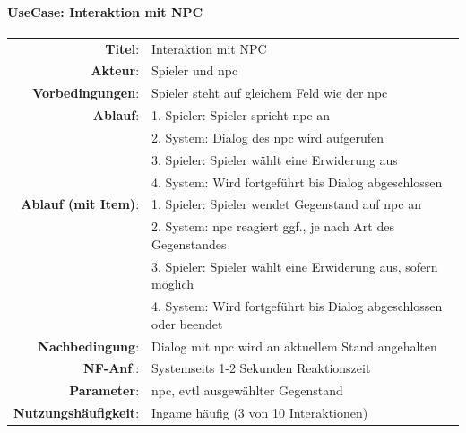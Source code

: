 \paragraph{UseCase: Interaktion mit NPC}
\begin{center}
	\begin{tabular}{|r l|}
	  \hline
	  \textbf{Titel}: & Interaktion mit NPC \\
	  \textbf{Akteur}: & \gls{Spieler} und \gls{npc} \\
	  \textbf{Vorbedingungen}: & \gls{Spieler} steht auf gleichem \gls{Feld} wie der \gls{npc} \\
	  \hline
	  \textbf{Ablauf}:
		& 1. Spieler: \gls{Spieler} spricht \gls{npc} an \\
		& 2. System:  \gls{Dialog} des \gls{npc} wird aufgerufen \\
		& 3. Spieler: \gls{Spieler} wählt eine \gls{Erwiderung} aus \\
		& 4. System:  Wird fortgeführt bis \gls{Dialog} abgeschlossen \\
	  \textbf{Ablauf (mit Item)}:
		& 1. Spieler: \gls{Spieler} wendet Gegenstand auf \gls{npc} an \\
		& 2. System:  \gls{npc} reagiert ggf., je nach Art des Gegenstandes \\
		& 3. Spieler: \gls{Spieler} wählt eine \gls{Erwiderung} aus, sofern möglich \\
		& 4. System:  Wird fortgeführt bis \gls{Dialog} abgeschlossen oder beendet \\
	  \hline
	  \textbf{Nachbedingung}: & \gls{Dialog} mit \gls{npc} wird an aktuellem Stand angehalten \\
	  \textbf{NF-Anf}.: & Systemseits 1-2 Sekunden Reaktionszeit \\
	  \textbf{Parameter}: & \gls{npc}, evtl ausgewählter Gegenstand \\
	  \textbf{Nutzungshäufigkeit}: & Ingame häufig (3 von 10 Interaktionen)\\
	  \hline
	\end{tabular}
\end{center}

